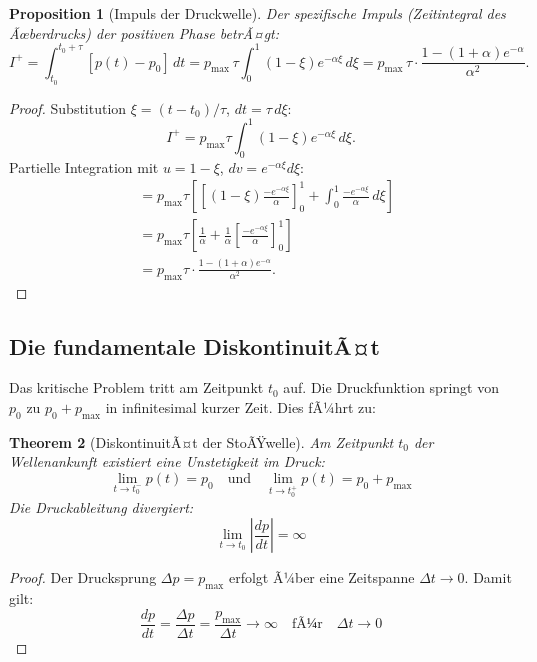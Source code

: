 ﻿\documentclass[12pt,a4paper]{article}
\newtheorem{theorem}{Theorem}[section]
\newtheorem{proposition}[theorem]{Proposition}
\theoremstyle{definition}
\theoremstyle{remark}
\begin{document}
\begin{proposition}[Impuls der Druckwelle]
\label{prop:impuls}
Der spezifische Impuls (Zeitintegral des Ãœber\-drucks) der positiven Phase betrÃ¤gt:
\begin{equation}
I^+ = \int_{t_0}^{t_0+\tau} [p(t)-p_0]\,dt = p_{\text{max}}\,\tau \int_0^1 (1-\xi)e^{-\alpha\xi}\,d\xi = p_{\text{max}}\,\tau \cdot \frac{1 - (1+\alpha)e^{-\alpha}}{\alpha^2}.
\end{equation}
\end{proposition}
\begin{proof}
Substitution $\xi = (t-t_0)/\tau$, $dt = \tau\,d\xi$:
\[
I^+ = p_{\text{max}}\tau\int_0^1(1-\xi)e^{-\alpha\xi}\,d\xi.
\]
Partielle Integration mit $u = 1-\xi$, $dv = e^{-\alpha\xi}d\xi$:
\begin{align*}
	&= p_{\text{max}}\tau\left[\left[(1-\xi)\frac{-e^{-\alpha\xi}}{\alpha}\right]_0^1 + \int_0^1 \frac{-e^{-\alpha\xi}}{\alpha}\,d\xi\right] \\
	&= p_{\text{max}}\tau\left[\frac{1}{\alpha} + \frac{1}{\alpha}\left[\frac{-e^{-\alpha\xi}}{\alpha}\right]_0^1\right] \\
	&= p_{\text{max}}\tau\cdot\frac{1-(1+\alpha)e^{-\alpha}}{\alpha^2}. 	
\end{align*}
\end{proof}

\subsection{Die fundamentale DiskontinuitÃ¤t}

Das kritische Problem tritt am Zeitpunkt $t_0$ auf. Die Druckfunktion springt von $p_0$ zu $p_0 + p_{\text{max}}$ in infinitesimal kurzer Zeit. Dies fÃ¼hrt zu:

\begin{theorem}[DiskontinuitÃ¤t der StoÃŸwelle]
Am Zeitpunkt $t_0$ der Wellenankunft existiert eine Unstetigkeit im Druck:
\begin{equation}
\lim_{t \to t_0^-} p(t) = p_0 \quad \text{und} \quad \lim_{t \to t_0^+} p(t) = p_0 + p_{\text{max}}
\end{equation}
Die Druckableitung divergiert:
\begin{equation}
\lim_{t \to t_0} \left|\frac{dp}{dt}\right| = \infty
\end{equation}
\end{theorem}

\begin{proof}
Der Drucksprung $\Delta p = p_{\text{max}}$ erfolgt Ã¼ber eine Zeitspanne $\Delta t \to 0$. Damit gilt:
\[
\frac{dp}{dt} = \frac{\Delta p}{\Delta t} = \frac{p_{\text{max}}}{\Delta t} \to \infty \quad \text{fÃ¼r} \quad \Delta t \to 0
\]
\end{proof}
\end{document}
